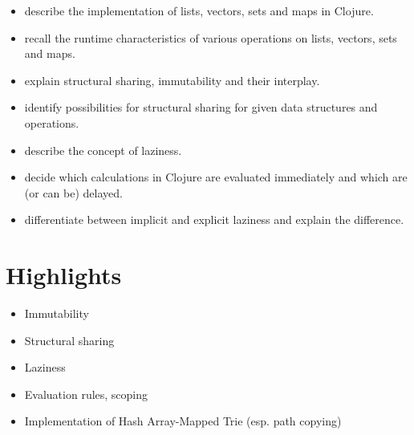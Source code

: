 \documentclass[11pt,a4paper]{article}
\begin{document}
\begin{itemize}
	\item describe the implementation of lists, vectors, sets and maps in Clojure.
    \item recall the runtime characteristics of various operations on lists, vectors, sets and maps.
    \item explain structural sharing, immutability and their interplay.
    \item identify possibilities for structural sharing for given data structures and operations.
    \item describe the concept of laziness.
    \item decide which calculations in Clojure are evaluated immediately and which are (or can be) delayed.
    \item differentiate between implicit and explicit laziness and explain the difference.
\end{itemize}

\section{Highlights}

\begin{itemize}
    \item Immutability
    \item Structural sharing
    \item Laziness
    \item Evaluation rules, scoping
    \item Implementation of Hash Array-Mapped Trie (esp. path copying)
\end{itemize}
\end{document}
